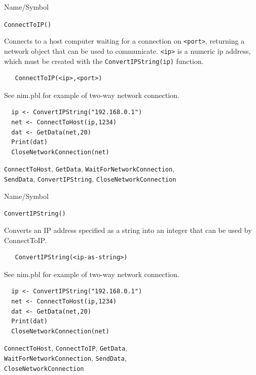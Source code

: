 \begin{desc}{Name/Symbol}
\item[Name/Symbol]	\verb+ConnectToIP()+

\item[Description]	Connects to a host computer waiting for a
  connection on \verb+<port>+, returning a network object that can be used to
  communicate.  \verb+<ip>+ is a numeric ip address, which must be
  created with the \verb+ConvertIPString(ip)+ function. 

\item[Usage]
\begin{verbatim}
   ConnectToIP(<ip>,<port>)
\end{verbatim}

\item[Example]	

  See nim.pbl for example of two-way network connection.
\begin{verbatim}
  ip <- ConvertIPString("192.168.0.1")
  net <- ConnectToHost(ip,1234)
  dat <- GetData(net,20)
  Print(dat)
  CloseNetworkConnection(net)
\end{verbatim}

\item[See Also]
  \verb+ConnectToHost+, \verb+GetData+, \verb+WaitForNetworkConnection+,\\
   \verb+SendData+, \verb+ConvertIPString+, \verb+CloseNetworkConnection+
\end{desc}





\begin{desc}{Name/Symbol}
\item[Name/Symbol] \verb+ConvertIPString()+

\item[Description]	Converts an IP address specified as a string into
  an integer that can be used by ConnectToIP.

\item[Usage]
\begin{verbatim}
   ConvertIPString(<ip-as-string>)
\end{verbatim}

\item[Example]	

  See nim.pbl for example of two-way network connection.
\begin{verbatim}
  ip <- ConvertIPString("192.168.0.1")
  net <- ConnectToHost(ip,1234)
  dat <- GetData(net,20)
  Print(dat)
  CloseNetworkConnection(net)
\end{verbatim}

\item[See Also]
  \verb+ConnectToHost+, \verb+ConnectToIP+, \verb+GetData+, \\ \verb+WaitForNetworkConnection+,
   \verb+SendData+, \\\verb+CloseNetworkConnection+
\end{desc}





